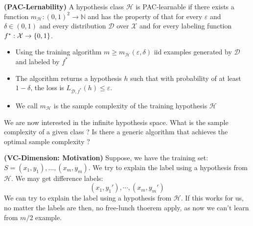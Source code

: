 \begin{definition}{\textbf{(PAC-Lernability)}}
    A hypothesis class $\mathcal{H}$ is PAC-learnable if there exists a function $m_\mathcal{H}:(0, 1)^2 \rightarrow \mathbb{N}$ and has the property of that for every $\varepsilon$ and $\delta \in (0, 1)$ and every distribution $\mathcal{D}$ over $\mathcal{X}$ and for every labeling function $f^* : \mathcal{X}\rightarrow \left\{ 0, 1 \right\}$.
    \begin{itemize}
        \item Using the training algorithm $m \ge m_\mathcal{H}(\varepsilon, \delta)$ iid examples generated by $\mathcal{D}$ and labeled by $f^*$
        \item The algorithm returns a hypothesis $h$ such that with probability of at least $1-\delta$, the loss is $L_{\mathcal{D}, f^*}(h)\le \varepsilon$. 
        \item We call $m_\mathcal{H}$ is the sample complexity of the training hypothesis $\mathcal{H}$
    \end{itemize}
\end{definition}

\begin{remark}
    We are now interested in the infinite hypothesis space. What is the sample complexity of a given class ? Is there a generic algorithm that achieves the optimal sample complexity ?
\end{remark}

\begin{remark}{\textbf{(VC-Dimension: Motivation)}}
    Suppose, we have the training set: $S = (x_1, y_1),\dots,(x_m,y_m)$. We try to explain the label using a hypothesis from $\mathcal{H}$. We may get difference labels:
    \begin{equation*}
        (x_1,y_1'),\cdots,(x_m, y_m')
    \end{equation*}
    We can try to explain the label using a hypothesis from $\mathcal{H}$. If this works for us, no matter the labels are then, no free-lunch thoerem apply, as now we can't learn from $m/2$ example. 
\end{remark}

